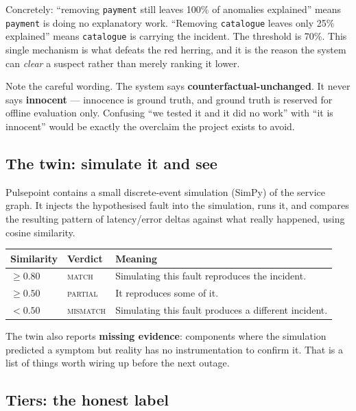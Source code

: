 \documentclass[11pt,a4paper]{article}
\newcommand{\code}[1]{\texttt{\small #1}}
\begin{document}
Concretely: ``removing \code{payment} still leaves 100\% of anomalies explained''
means \code{payment} is doing no explanatory work. ``Removing \code{catalogue}
leaves only 25\% explained'' means \code{catalogue} is carrying the incident.
The threshold is 70\%. This single mechanism is what defeats the red herring, and
it is the reason the system can \emph{clear} a suspect rather than merely
ranking it lower.

Note the careful wording. The system says \textbf{counterfactual-unchanged}. It
never says \textbf{innocent} --- innocence is ground truth, and ground truth is
reserved for offline evaluation only. Confusing ``we tested it and it did no
work'' with ``it is innocent'' would be exactly the overclaim the project exists
to avoid.

\subsection{The twin: simulate it and see}

Pulsepoint contains a small discrete-event simulation (SimPy) of the service
graph. It injects the hypothesised fault into the simulation, runs it, and
compares the resulting pattern of latency/error deltas against what really
happened, using cosine similarity.

\begin{center}
\footnotesize
\begin{tabular}{@{}lll@{}}
\toprule
\textbf{Similarity} & \textbf{Verdict} & \textbf{Meaning} \\
\midrule
$\geq 0.80$ & \textsc{match}    & Simulating this fault reproduces the incident. \\
$\geq 0.50$ & \textsc{partial}  & It reproduces some of it. \\
$< 0.50$    & \textsc{mismatch} & Simulating this fault produces a different incident. \\
\bottomrule
\end{tabular}
\end{center}

The twin also reports \textbf{missing evidence}: components where the simulation
predicted a symptom but reality has no instrumentation to confirm it. That is a
list of things worth wiring up before the next outage.

\subsection{Tiers: the honest label}
\end{document}
